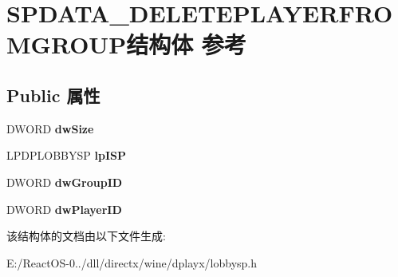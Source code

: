 \hypertarget{struct_s_p_d_a_t_a___d_e_l_e_t_e_p_l_a_y_e_r_f_r_o_m_g_r_o_u_p}{}\section{S\+P\+D\+A\+T\+A\+\_\+\+D\+E\+L\+E\+T\+E\+P\+L\+A\+Y\+E\+R\+F\+R\+O\+M\+G\+R\+O\+U\+P结构体 参考}
\label{struct_s_p_d_a_t_a___d_e_l_e_t_e_p_l_a_y_e_r_f_r_o_m_g_r_o_u_p}
\subsection*{Public 属性}
\begin{DoxyCompactItemize}
\item 
\mbox{\label{struct_s_p_d_a_t_a___d_e_l_e_t_e_p_l_a_y_e_r_f_r_o_m_g_r_o_u_p_af7674850a17b34e4e2b188f319a25578}} 
D\+W\+O\+RD {\bfseries dw\+Size}
\item 
\mbox{\label{struct_s_p_d_a_t_a___d_e_l_e_t_e_p_l_a_y_e_r_f_r_o_m_g_r_o_u_p_abe81b731a34dd364494942d2e53d6f45}} 
L\+P\+D\+P\+L\+O\+B\+B\+Y\+SP {\bfseries lp\+I\+SP}
\item 
\mbox{\label{struct_s_p_d_a_t_a___d_e_l_e_t_e_p_l_a_y_e_r_f_r_o_m_g_r_o_u_p_aa3a096763a02b73aaa218f8f6667a263}} 
D\+W\+O\+RD {\bfseries dw\+Group\+ID}
\item 
\mbox{\label{struct_s_p_d_a_t_a___d_e_l_e_t_e_p_l_a_y_e_r_f_r_o_m_g_r_o_u_p_a36cc8a18fcd08c17a3f2b6755223edbe}} 
D\+W\+O\+RD {\bfseries dw\+Player\+ID}
\end{DoxyCompactItemize}


该结构体的文档由以下文件生成\+:\begin{DoxyCompactItemize}
\item 
E\+:/\+React\+O\+S-\/0../dll/directx/wine/dplayx/lobbysp.\+h\end{DoxyCompactItemize}
